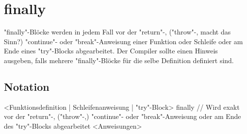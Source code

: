 \chapter{finally}
"finally"-Blöcke werden in jedem Fall vor der "return"-, ("throw"-, macht das Sinn?)  "continue"- oder "break"-Anweisung einer Funktion oder Schleife oder
am Ende eines "try"-Blocks abgearbeitet.
Der Compiler sollte einen Hinweis ausgeben, falls mehrere "finally"-Blöcke für die selbe Definition definiert sind.

\section{Notation}
<Funktionsdefinition | Schleifenanweisung | "try"-Block>
finally // Wird exakt vor der "return"-, ("throw"-,) "continue"- oder "break"-Anweisung oder am Ende des "try"-Blocks abgearbeitet
	<Anweisungen>